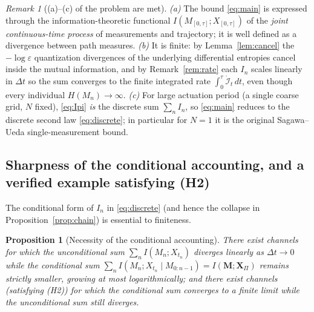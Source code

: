 \documentclass{amsart}
\newtheorem{proposition}{Proposition}
\theoremstyle{definition}
\theoremstyle{remark}
\newtheorem{remark}{Remark}
\begin{document}
\begin{remark}[(a)--(c) of the problem are met]\label{rem:abc}
\emph{(a)} The bound \eqref{eq:main} is expressed through the
information-theoretic functional $I(M_{[0,\tau]};X_{[0,\tau]})$ of the
\emph{joint continuous-time process} of measurements and trajectory; it
is well defined as a divergence between path measures.
\emph{(b)} It is finite: by Lemma~\ref{lem:cancel} the
$-\log\varepsilon$ quantization divergences of the underlying
differential entropies cancel inside the mutual information, and by
Remark~\ref{rem:rate} each $I_n$ scales linearly in $\Delta t$ so the
sum converges to the finite integrated rate
$\int_0^\tau\dot{\mathcal I}_t\,dt$, even though every individual
$H(M_n)\to\infty$. \emph{(c)} For large actuation period (a single
coarse grid, $N$ fixed), \eqref{eq:Ipi} \emph{is} the discrete sum
$\sum_n I_n$, so \eqref{eq:main} reduces to the discrete second law
\eqref{eq:discrete}; in particular for $N=1$ it is the original
Sagawa--Ueda single-measurement bound.
\end{remark}

\subsection{Sharpness of the conditional accounting, and a verified
example satisfying (H2)}
The conditional form of $I_n$ in \eqref{eq:discrete} (and hence the
collapse in Proposition~\ref{prop:chain}) is essential to finiteness.

\begin{proposition}[Necessity of the conditional accounting]
\label{prop:sharp}
There exist channels for which the \emph{unconditional} sum
$\sum_n I(M_n;X_{t_n})$ diverges linearly as $\Delta t\to0$ while the
\emph{conditional} sum
$\sum_n I(M_n;X_{t_n}\mid M_{0:n-1})=I(\mathbf M;\mathbf X_\Pi)$ remains
strictly smaller, growing at most logarithmically; and there exist
channels (satisfying (H2)) for which the conditional sum converges to a
finite limit while the unconditional sum still diverges.
\end{proposition}
\end{document}
